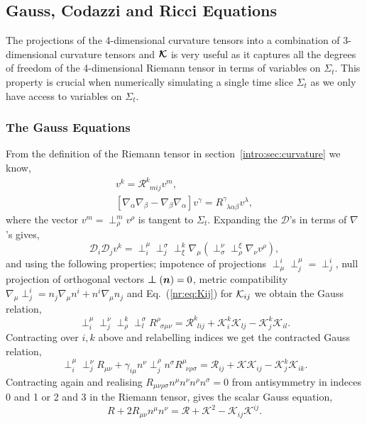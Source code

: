 \subsection{Gauss, Codazzi and Ricci Equations}\label{nr:sec:gausscodazzi}
The projections of the 4-dimensional curvature tensors into a combination of 3-dimensional curvature tensors and $\boldsymbol{\mathcal{K}}$ is very useful as it captures all the degrees of freedom of the 4-dimensional Riemann tensor in terms of variables on $\Sigma_t$. This property is crucial when numerically simulating a single time slice $\Sigma_t$ as we only have access to variables on $\Sigma_t$.

\subsubsection{The Gauss Equations}
From the definition of the Riemann tensor in section~\ref{intro:sec:curvature} we know,
\begin{align} 
[\mathcal{D}_ i \mathcal{D}_ j -\mathcal{D}_ j \mathcal{D}_ i ]v^ k  = \mathcal{R}^ k _{\,\,\, m  i  j }v^ m  , \\
 [\nabla_\alpha\nabla_\beta-\nabla_\beta\nabla_\alpha]v^\gamma = {R}^\gamma_{\,\,\,\lambda \alpha\beta}v^\lambda  , 
 \end{align}
where the vector $v^ m = \perp^ m  _\rho v^\rho$ is tangent to $\Sigma_t$. Expanding the $\mathcal{D}$'s in terms of $\nabla$'s gives,
\begin{equation} \mathcal{D}_ i  \mathcal{D}_ j  v^ k  = \perp^\mu_ i  \perp_ j ^\sigma \perp^ k _\xi \nabla_\mu(\perp^\nu_\sigma \perp^\xi_\rho \nabla_\nu v^\rho),\end{equation}
and using the following properties; impotence of projections $\perp^ i _\mu \perp^\mu_ j  = \perp^ i _ j $, null projection of orthogonal vectors $\boldsymbol{\perp} (\boldsymbol{n}) =0$, metric compatibility $\nabla_\mu \perp^ i _ j  = n_ j \nabla_\mu n^ i  + n^ i  \nabla_\mu n_ j $ and Eq.~(\ref{nr:eq:Kij}) for $\mathcal{K}_{ij}$ we obtain the Gauss relation,
\begin{equation} \perp^\mu_ i  \perp^\nu_ j  \perp^ k _\rho \perp^\sigma_ l R^{\rho}_{\,\,\,\sigma\mu\nu} = \mathcal{R}^ k _{\,\,\, l i  j } + \mathcal{K}^ k _ i  \mathcal{K}_{ l j } - \mathcal{K}^ k _ j  \mathcal{K}_{ i l} . \end{equation}
Contracting over $ i , k $ above and relabelling indices we get the contracted Gauss relation,
\begin{equation} \perp^\mu_ i  \perp^\nu_ j  R_{\mu\nu} +  \gamma _{ i \mu}n^\nu\perp^\rho_ j  n^\sigma R^\mu_{\,\,\,\nu\rho\sigma} = \mathcal{R}_{ i  j } + \mathcal{K} \mathcal{K}_{ i  j } - \mathcal{K}^k_ j  \mathcal{K}_{ i k}.  \end{equation}
Contracting again and realising $R_{\mu\nu\rho\sigma}n^\mu n^\nu n^\rho n^\sigma=0$ from antisymmetry in indeces 0 and 1 or 2 and 3 in the Riemann tensor, gives the scalar Gauss equation,
\begin{equation}R + 2R_{\mu\nu}n^\mu n^\nu = \mathcal{R} + \mathcal{K}^2 - \mathcal{K}_{ij}\mathcal{K}^{ij}.\end{equation}

